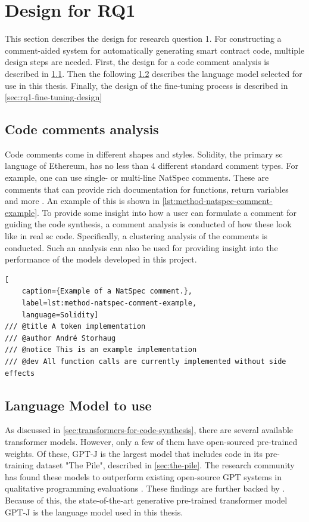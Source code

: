 \section{Design for RQ1}
\label{sec:design-for-rq1}
This section describes the design for research question 1. For constructing a comment-aided system for automatically generating smart contract code, multiple design steps are needed. First, the design for a code comment analysis is described in \cref{sec:code-comments-analysis}. Then the following \cref{sec:language-model} describes the language model selected for use in this thesis. Finally, the design of the fine-tuning process is described in \cref{sec:rq1-fine-tuning-design}


\subsection{Code comments analysis}
\label{sec:code-comments-analysis}
Code comments come in different shapes and styles. Solidity, the primary \acrshort{sc} language of Ethereum, has no less than 4 different standard comment types. For example, one can use single- or multi-line NatSpec comments. These are comments that can provide rich documentation for functions, return variables and more \cite{natspec}. An example of this is shown in \cref{lst:method-natspec-comment-example}. To provide some insight into how a user can formulate a comment for guiding the code synthesis, a comment analysis is conducted of how these look like in real \acrshort{sc} code. Specifically, a clustering analysis of the comments is conducted. Such an analysis can also be used for providing insight into the performance of the models developed in this project.

\begin{lstlisting}[
    caption={Example of a NatSpec comment.},
    label=lst:method-natspec-comment-example,
    language=Solidity]
/// @title A token implementation
/// @author André Storhaug
/// @notice This is an example implementation
/// @dev All function calls are currently implemented without side effects
\end{lstlisting}

\subsection{Language Model to use}
\label{sec:language-model}
As discussed in \cref{sec:transformers-for-code-synthesis}, there are several available transformer models. However, only a few of them have open-sourced pre-trained weights. Of these, GPT-J \cite{gpt-j} is the largest model that includes code in its pre-training dataset "The Pile", described in \cref{sec:the-pile}. The research community has found these models to outperform existing open-source GPT systems in qualitative programming evaluations \cite{wolf2021}. These findings are further backed by \cite{chen2021codex}. Because of this, the state-of-the-art generative pre-trained transformer model GPT-J is the language model used in this thesis.

